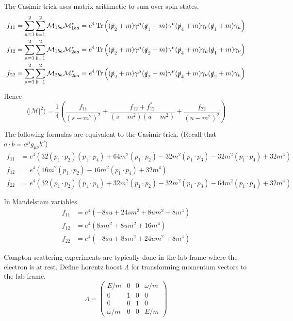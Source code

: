 The Casimir trick uses matrix arithmetic to sum over spin states.
\begin{align*}
f_{11}&=\sum_{a=1}^2\sum_{b=1}^2\mathcal M_{1ba}\mathcal M_{1ba}^*=e^4\operatorname{Tr}
\left(
(\slashed{p}_2+m)\gamma^\mu(\slashed{q}_1+m)\gamma^\nu(\slashed{p}_4+m)\gamma_\nu(\slashed{q}_1+m)\gamma_\mu
\right)
\\
f_{12}&=\sum_{a=1}^2\sum_{b=1}^2\mathcal M_{1ba}\mathcal M_{2ba}^*=e^4\operatorname{Tr}
\left(
(\slashed{p}_2+m)\gamma^\mu(\slashed{q}_2+m)\gamma^\nu(\slashed{p}_4+m)\gamma_\mu(\slashed{q}_1+m)\gamma_\nu
\right)
\\
f_{22}&=\sum_{a=1}^2\sum_{b=1}^2\mathcal M_{2ba}\mathcal M_{2ba}^*=e^4\operatorname{Tr}
\left(
(\slashed{p}_2+m)\gamma^\mu(\slashed{q}_2+m)\gamma^\nu(\slashed{p}_4+m)\gamma_\nu(\slashed{q}_2+m)\gamma_\mu
\right)
\end{align*}

Hence
\begin{equation*}
\langle|\mathcal{M}|^2\rangle
=
\frac{1}{4}
\left(
\frac{f_{11}}{(s-m^2)^2}
+\frac{f_{12}+f_{12}^*}{(s-m^2)(u-m^2)}
+\frac{f_{22}}{(u-m^2)^2}
\right)
\tag{1}
\end{equation*}

The following formulas are equivalent to the Casimir trick.
(Recall that $a\cdot b=a^\mu g_{\mu\nu}b^\nu$)
\begin{align*}
f_{11}&=e^4\left(
 32 (p_1 \cdot p_2) (p_1 \cdot p_4) +
 64 m^2 (p_1 \cdot p_2) -
 32 m^2 (p_1 \cdot p_3) -
 32 m^2 (p_1 \cdot p_4) + 32 m^4\right)
\\
f_{12}&=e^4\left(16 m^2 (p_1 \cdot p_2) - 16 m^2 (p_1 \cdot p_4) + 32m^4\right)
\\
f_{22}&=e^4\left(
32 (p_1 \cdot p_2) (p_1 \cdot p_4) +
32 m^2 (p_1 \cdot p_2) -
32 m^2 (p_1 \cdot p_3) -
64 m^2 (p_1 \cdot p_4) + 32 m^4\right)
\end{align*}

In Mandelstam variables
\begin{equation*}
\begin{aligned}
f_{11}&=e^4\left(-8 s u + 24 s m^2 + 8 u m^2 + 8 m^4\right)
\\
f_{12}&=e^4\left(8 s m^2 + 8 u m^2 + 16 m^4\right)
\\
f_{22}&=e^4\left(-8 s u + 8 s m^2 + 24 u m^2 + 8 m^4\right)
\end{aligned}
\tag{2}
\end{equation*}

Compton scattering experiments are typically done in the lab frame where the electron is at rest.
Define Lorentz boost $\Lambda$ for transforming momentum vectors to the lab frame.
\begin{equation*}
\Lambda=
\begin{pmatrix}
E/m & 0 & 0 & \omega/m\\
0 & 1 & 0 & 0\\
0 & 0 & 1 & 0\\
\omega/m & 0 & 0 & E/m
\end{pmatrix}
\end{equation*}

